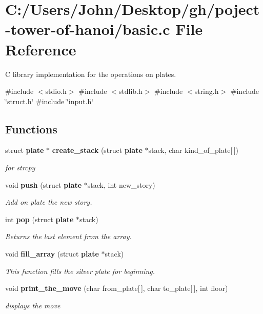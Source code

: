 \section{C\+:/\+Users/\+John/\+Desktop/gh/poject-\/tower-\/of-\/hanoi/basic.c File Reference}
\label{basic_8c}


C library implementation for the operations on plates.  


{\ttfamily \#include $<$stdio.\+h$>$}\newline
{\ttfamily \#include $<$stdlib.\+h$>$}\newline
{\ttfamily \#include $<$string.\+h$>$}\newline
{\ttfamily \#include \char`\"{}struct.\+h\char`\"{}}\newline
{\ttfamily \#include \char`\"{}input.\+h\char`\"{}}\newline
\subsection*{Functions}
\begin{DoxyCompactItemize}
\item 
struct \textbf{ plate} $\ast$ \textbf{ create\+\_\+stack} (struct \textbf{ plate} $\ast$stack, char kind\+\_\+of\+\_\+plate[$\,$])
\begin{DoxyCompactList}\small\item\em for strcpy \end{DoxyCompactList}\item 
void \textbf{ push} (struct \textbf{ plate} $\ast$stack, int new\+\_\+story)
\begin{DoxyCompactList}\small\item\em Add on plate the new story. \end{DoxyCompactList}\item 
int \textbf{ pop} (struct \textbf{ plate} $\ast$stack)
\begin{DoxyCompactList}\small\item\em Returns the last element from the array. \end{DoxyCompactList}\item 
void \textbf{ fill\+\_\+array} (struct \textbf{ plate} $\ast$stack)
\begin{DoxyCompactList}\small\item\em This function fills the silver plate for beginning. \end{DoxyCompactList}\item 
void \textbf{ print\+\_\+the\+\_\+move} (char from\+\_\+plate[$\,$], char to\+\_\+plate[$\,$], int floor)
\begin{DoxyCompactList}\small\item\em displays the move \end{DoxyCompactList}\end{DoxyCompactItemize}


